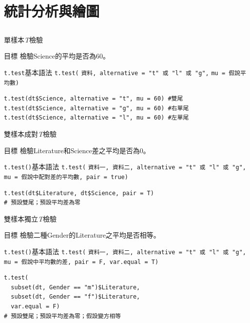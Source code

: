 \documentclass[12pt]{beamer}
\begin{document}
\section{統計分析與繪圖}\subsection{}

\begin{frame}[fragile]{單樣本\emph{T}檢驗}

\begin{block}{目標}
檢驗Science的平均是否為60。
\end{block}
\begin{block}{\texttt{t.test}基本語法}
\verb+t.test(+
  \verb+資料, alternative = "t" 或 "l" 或 "g",+
  \verb+mu = 假說平均數)+
\end{block}
\begin{verbatim}
t.test(dt$Science, alternative = "t", mu = 60) #雙尾
t.test(dt$Science, alternative = "g", mu = 60) #右單尾
t.test(dt$Science, alternative = "l", mu = 60) #左單尾
\end{verbatim}
\end{frame}

\begin{frame}[fragile]{雙樣本成對\emph{T}檢驗}
\begin{block}{目標}
檢驗Literature和Science差之平均是否為0。
\end{block}
\begin{block}{\texttt{t.test()}基本語法}
\verb+t.test(+
\verb+資料一, 資料二, alternative = "t" 或 "l" 或 "g",+
\verb+mu = 假說中配對差的平均數, pair = true)+
\end{block}
\begin{verbatim}
t.test(dt$Literature, dt$Science, pair = T)
# 預設雙尾；預設平均差為零
\end{verbatim}
\end{frame}


\begin{frame}[fragile]{雙樣本獨立\emph{T}檢驗}
\begin{block}{目標}
檢驗二種Gender的Literature之平均是否相等。
\end{block}
\begin{block}{\texttt{t.test()}基本語法}
\verb+t.test(+
\verb+資料一, 資料二, alternative = "t" 或 "l" 或 "g",+
\verb+mu = 假說中平均數的差, pair = F, var.equal = T)+
\end{block}
\begin{verbatim}
t.test(
  subset(dt, Gender == "m")$Literature,
  subset(dt, Gender == "f")$Literature,
  var.equal = F)
# 預設雙尾；預設平均差為零；假設變方相等
\end{verbatim}
\end{frame}
\end{document}
